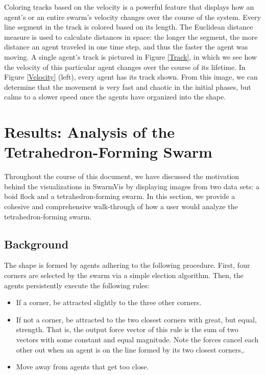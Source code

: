 \documentclass{vgtc}
\begin{document}
Coloring tracks based on the velocity is a powerful feature that displays how an agent's or an entire swarm's
velocity changes over the course of the system.
Every line segment in the track is colored based on its length. The Euclidean distance measure is used to calculate distances in space: the longer the segment, the more distance an agent traveled in one time step,
and thus the faster the agent was moving.
A single agent's track is pictured in Figure \ref{Track}, in which we see how the velocity of this particular agent changes over the course of its lifetime.
In Figure \ref{Velocity} (left), every agent has its track shown.
From this image, we can determine that the movement is very fast and chaotic in the initial phases, but calms to a slower speed once the agents have organized into the shape.

\section{Results: Analysis of the Tetrahedron-Forming Swarm}

Throughout the course of this document, we have discussed the motivation behind the visualizations in SwarmVis by
displaying images from two data sets: a boid flock and a tetrahedron-forming swarm.
In this section, we provide a cohesive and comprehensive walk-through of how a user would
analyze the tetrahedron-forming swarm.

\subsection{Background}

The shape is formed by agents adhering to the following procedure.
First, four corners are selected by the swarm via a simple election algorithm.
Then, the agents persistently execute the following rules:
\begin{itemize}
	\item If a corner, be attracted slightly to the three other corners.
	\item If not a corner, be attracted to the two closest corners with great, but equal, strength.
	That is, the output force vector of this rule is the sum of two vectors with some constant and equal magnitude.
	Note the forces cancel each other out when an agent is on the line formed by its two closest corners,.
	\item Move away from agents that get too close.
\end{itemize}
\end{document}
